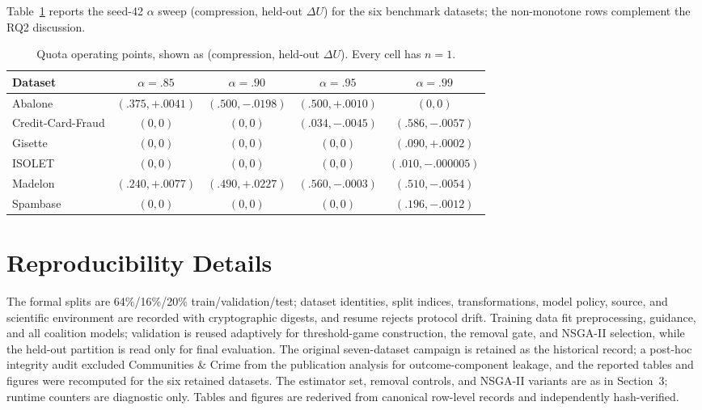 \documentclass{article}
\begin{document}
Table~\ref{tab:alpha} reports the seed-42 $\alpha$ sweep (compression, held-out $\Delta U$) for the six benchmark datasets; the non-monotone rows complement the RQ2 discussion.

\begin{table}[H]
\caption{Quota operating points, shown as (compression, held-out $\Delta U$). Every cell has $n=1$.}
\label{tab:alpha}
\centering
\scriptsize
\begin{tabular}{lcccc}
\toprule
Dataset & $\alpha=.85$ & $\alpha=.90$ & $\alpha=.95$ & $\alpha=.99$ \\
\midrule
Abalone & $(.375,+.0041)$ & $(.500,-.0198)$ & $(.500,+.0010)$ & $(0,0)$ \\
Credit-Card-Fraud & $(0,0)$ & $(0,0)$ & $(.034,-.0045)$ & $(.586,-.0057)$ \\
Gisette & $(0,0)$ & $(0,0)$ & $(0,0)$ & $(.090,+.0002)$ \\
ISOLET & $(0,0)$ & $(0,0)$ & $(0,0)$ & $(.010,-.000005)$ \\
Madelon & $(.240,+.0077)$ & $(.490,+.0227)$ & $(.560,-.0003)$ & $(.510,-.0054)$ \\
Spambase & $(0,0)$ & $(0,0)$ & $(0,0)$ & $(.196,-.0012)$ \\
\bottomrule
\end{tabular}
\end{table}

\section{Reproducibility Details}

The formal splits are 64\%/16\%/20\% train/validation/test; dataset identities, split indices, transformations, model policy, source, and scientific environment are recorded with cryptographic digests, and resume rejects protocol drift. Training data fit preprocessing, guidance, and all coalition models; validation is reused adaptively for threshold-game construction, the removal gate, and NSGA-II selection, while the held-out partition is read only for final evaluation. The original seven-dataset campaign is retained as the historical record; a post-hoc integrity audit excluded Communities \& Crime from the publication analysis for outcome-component leakage, and the reported tables and figures were recomputed for the six retained datasets. The estimator set, removal controls, and NSGA-II variants are as in Section~3; runtime counters are diagnostic only. Tables and figures are rederived from canonical row-level records and independently hash-verified.
\end{document}
